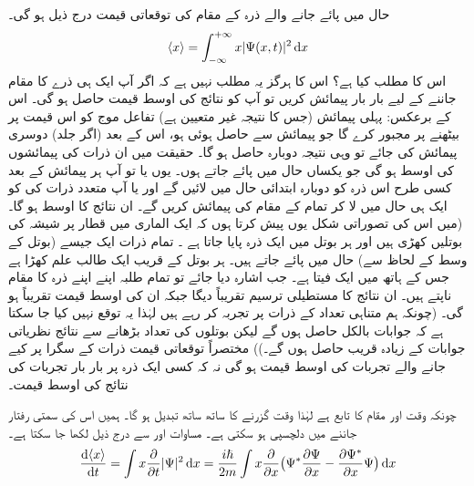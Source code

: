  حال  میں پائے جانے والے ذرہ  کے مقام  کی توقعاتی قیمت درج ذیل ہو گی۔
\begin{align}
\langle x\rangle=\int_{-\infty}^{+\infty}x|\Psi (x,t)|^{2}\dif{x}
\end{align}
اس کا مطلب کیا ہے؟ اس کا  ہرگز یہ مطلب نہیں ہے کہ اگر آپ ایک ہی ذرے کا مقام جاننے کے لیے بار بار پیمائش کریں تو آپ کو نتائج کی اوسط قیمت   حاصل ہو گی۔ اس کے برعکس: پہلی پیمائش (جس کا نتیجہ غیر متعیین ہے) تفاعل موج کو اس قیمت پر بیٹھنے پر مجبور کرے گا جو پیمائش سے حاصل ہوئی ہو، اس کے بعد (اگر جلد) دوسری پیمائش کی جائے تو وہی نتیجہ دوبارہ حاصل ہو گا۔ حقیقت میں 
 ان ذرات کی  پیمائشوں کی اوسط ہو گی جو یکساں حال  میں پائے جاتے ہوں۔ یوں یا تو آپ ہر پیمائش کے بعد کسی طرح اس ذرہ کو دوبارہ ابتدائی حال  میں لائیں گے اور یا آپ متعدد ذرات کی  کو ایک ہی حال   میں لا کر تمام کے مقام کی  پیمائش کریں گے۔ ان نتائج کا اوسط  ہو گا۔ (میں اس کی تصوراتی شکل یوں پیش کرتا ہوں کہ ایک الماری میں  قطار پر شیشہ کی بوتلیں کھڑی ہیں اور ہر بوتل میں ایک ذرہ پایا جاتا ہے ۔ تمام ذرات ایک جیسے  (بوتل کے وسط کے لحاظ سے) حال  میں پائے جاتے ہیں۔ ہر بوتل کے قریب ایک طالب علم  کھڑا ہے جس کے ہاتھ میں ایک فیتا  ہے۔ جب اشارہ  دیا جائے تو تمام طلبہ اپنے اپنے ذرہ  کا مقام ناپتے ہیں۔ ان نتائج کا مستطیلی ترسیم تقریباً  دیگا جبکہ ان کی اوسط قیمت تقریباً  ہو گی۔ (چونکہ ہم متناہی تعداد کے ذرات پر تجربہ  کر رہے ہیں لہٰذا  یہ توقع نہیں کیا جا سکتا ہے کہ جوابات بالکل حاصل ہوں گے لیکن بوتلوں  کی تعداد بڑھانے سے نتائج نظریاتی جوابات کے  زیادہ قریب حاصل ہوں گے۔)) مختصراً توقعاتی قیمت ذرات کے  سگرا پر کیے جانے والے تجربات کی اوسط قیمت ہو گی نہ کہ کسی ایک ذرہ پر بار بار تجربات کی نتائج کی اوسط قیمت۔

 چونکہ  وقت اور مقام کا تابع ہے لہٰذا وقت گزرنے کا ساتھ ساتھ  تبدیل ہو گا۔ ہمیں اس کی سمتی رفتار جاننے میں دلچسپی ہو سکتی ہے۔ مساوات  اور  سے درج ذیل لکھا جا سکتا ہے۔
\begin{align}\label{مساوات_تفاعل_موج_رفتار_توقعاتی_الف}
\frac{\dif \,\langle x \rangle}{\dif{t}}=\int x\frac{\partial}{\partial{t}}|\Psi|^{2}\dif{x}=\frac{i\hslash}{2m}\int x\frac{\partial}{\partial{x}}\big (\Psi ^*\frac{\partial{\Psi}}{\partial{x}}-\frac{\partial{\Psi^ *}}{\partial{x}}\Psi \big)\dif{x}
\end{align}

